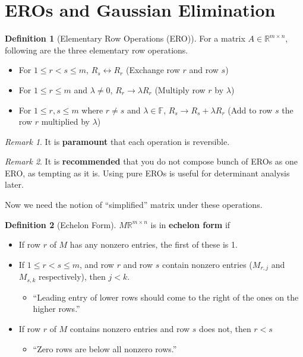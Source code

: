 \documentclass[12pt, a4paper]{article}
\newcommand{\R}{\mathbb{R}}
\theoremstyle{remark}
\newtheorem{remark}{Remark}
\theoremstyle{definition}
\newtheorem{definition}{Definition}
\numberwithin{equation}{section}
\numberwithin{definition}{section}
\numberwithin{example}{section}
\numberwithin{exercise}{section}
\numberwithin{remark}{section}
\numberwithin{figure}{section}
\begin{document}
\section{EROs and Gaussian Elimination}
\begin{definition}[Elementary Row Operations (ERO)]
    For a matrix $A \in \R^{m \times n}$, following are the three elementary row operations.
    \begin{itemize}
        \item For $1 \leq r < s \leq m$, $R_s \leftrightarrow R_r$ (Exchange row $r$ and row $s$)
        \item For $1 \leq r \leq m$ and $\lambda \neq 0$, $R_r \rightarrow \lambda R_r$ (Multiply row $r$ by $\lambda$)
        \item For $1 \leq r, s \leq m$ where $r \neq s$ and $\lambda \in \mathbb{F}$, $R_s \rightarrow R_s + \lambda R_r$ (Add to row $s$ the row $r$ multiplied by $\lambda$)
    \end{itemize}
\end{definition}
\begin{remark}
    It is \textbf{paramount} that each operation is reversible.
\end{remark}
\begin{remark}
    It is \textbf{recommended} that you do not compose bunch of EROs as one ERO, as tempting as it is.
    Using pure EROs is useful for determinant analysis later.
\end{remark}
Now we need the notion of ``simplified'' matrix under these operations.
\begin{definition}[Echelon Form]
    $M \R^{m \times n}$ is in \textbf{echelon form} if
    \begin{itemize}
        \item If row $r$ of $M$ has any nonzero entries, the first of these is 1.
        \item If $1 \leq r < s \leq m$, and row $r$ and row $s$ contain nonzero entries ($M_{r,j}$ and $M_{s, k}$ respectively), then $j < k$.
            \begin{itemize}
                \item ``Leading entry of lower rows should come to the right of the ones on the higher rows.''
            \end{itemize}
        \item If row $r$ of $M$ contains nonzero entries and row $s$ does not, then $r < s$
            \begin{itemize}
                \item ``Zero rows are below all nonzero rows.''
            \end{itemize}
    \end{itemize}
\end{definition}
\end{document}
